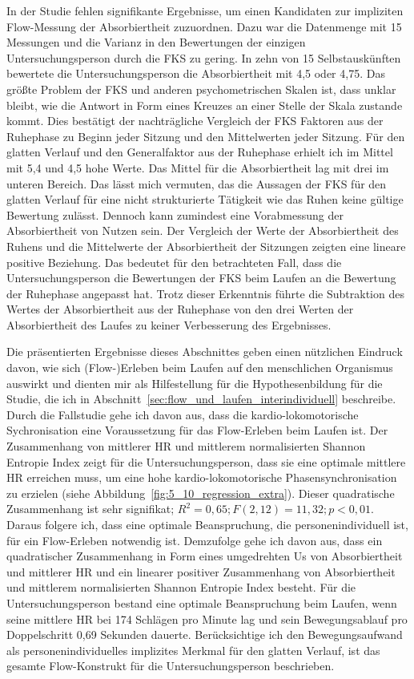 In der Studie fehlen signifikante Ergebnisse, um einen Kandidaten zur impliziten Flow-Messung der Absorbiertheit zuzuordnen. Dazu war die Datenmenge mit 15 Messungen und die Varianz in den Bewertungen der einzigen Untersuchungsperson durch die \ac{FKS} zu gering. In zehn von 15 Selbstauskünften bewertete die Untersuchungsperson die Absorbiertheit mit 4,5 oder 4,75. Das größte Problem der \ac{FKS} und anderen psychometrischen Skalen ist, dass unklar bleibt, wie die Antwort in Form eines Kreuzes an einer Stelle der Skala zustande kommt. Dies bestätigt der nachträgliche Vergleich der \ac{FKS} Faktoren aus der Ruhephase zu Beginn jeder Sitzung und den Mittelwerten jeder Sitzung. Für den glatten Verlauf und den Generalfaktor aus der Ruhephase erhielt ich im Mittel mit 5,4 und 4,5 hohe Werte. Das Mittel für die Absorbiertheit lag mit drei im unteren Bereich. Das lässt mich vermuten, das die Aussagen der \ac{FKS} für den glatten Verlauf für eine nicht strukturierte Tätigkeit wie das Ruhen keine gültige Bewertung zulässt. Dennoch kann zumindest eine Vorabmessung der Absorbiertheit von Nutzen sein. Der Vergleich der Werte der Absorbiertheit des Ruhens und die Mittelwerte der Absorbiertheit der Sitzungen zeigten eine lineare positive Beziehung. Das bedeutet für den betrachteten Fall, dass die Untersuchungsperson die Bewertungen der \ac{FKS} beim Laufen an die Bewertung der Ruhephase angepasst hat. Trotz dieser Erkenntnis führte die Subtraktion des Wertes der Absorbiertheit aus der Ruhephase von den drei Werten der Absorbiertheit des Laufes zu keiner Verbesserung des Ergebnisses.

Die präsentierten Ergebnisse dieses Abschnittes geben einen nützlichen Eindruck davon, wie sich (Flow-)Erleben beim Laufen auf den menschlichen Organismus auswirkt und dienten mir als Hilfestellung für die Hypothesenbildung für die Studie, die ich in Abschnitt~\ref{sec:flow_und_laufen_interindividuell} beschreibe. Durch die Fallstudie gehe ich davon aus, dass die kardio-lokomotorische Sychronisation eine Voraussetzung für das Flow-Erleben beim Laufen ist. Der Zusammenhang von mittlerer \ac{HR} und mittlerem normalisierten Shannon Entropie Index zeigt für die Untersuchungsperson, dass sie eine optimale mittlere \ac{HR} erreichen muss, um eine hohe kardio-lokomotorische Phasensynchronisation zu erzielen (siehe Abbildung~\ref{fig:5_10_regression_extra}). Dieser quadratische Zusammenhang ist sehr signifikat; $R^2 = 0{,}65; F(2, 12) = 11{,}32; p < 0{,}01$. Daraus folgere ich, dass eine optimale Beanspruchung, die personenindividuell ist, für ein Flow-Erleben notwendig ist. Demzufolge gehe ich davon aus, dass ein quadratischer Zusammenhang in Form eines umgedrehten Us von Absorbiertheit und mittlerer \ac{HR} und ein linearer positiver Zusammenhang von Absorbiertheit und mittlerem normalisierten Shannon Entropie Index besteht. Für die Untersuchungsperson bestand eine optimale Beanspruchung beim Laufen, wenn seine mittlere \ac{HR} bei 174 Schlägen pro Minute lag und sein Bewegungsablauf pro Doppelschritt 0,69 Sekunden dauerte. Berücksichtige ich den Bewegungsaufwand als personenindividuelles implizites Merkmal für den glatten Verlauf, ist das gesamte Flow-Konstrukt für die Untersuchungsperson beschrieben.

